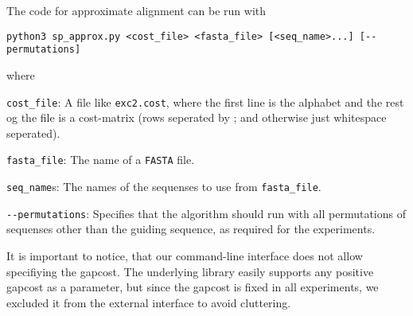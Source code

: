 The code for approximate alignment can be run with

\begin{verbatim}
python3 sp_approx.py <cost_file> <fasta_file> [<seq_name>...] [--permutations]
\end{verbatim}

where

\begin{description}
\item{\verb|cost_file|:} A file like \verb|exc2.cost|, where the
  first line is the alphabet and the rest og the file is a cost-matrix
  (rows seperated by ; and otherwise just whitespace seperated).
\item{\verb|fasta_file|:} The name of a \verb|FASTA| file.
\item{\verb|seq_name|s:} The names of the sequenses to use from
  \verb|fasta_file|.
\item{\verb|--permutations|:} Specifies that the algorithm should run
  with all permutations of sequenses other than the guiding sequence,
  as required for the experiments.
\end{description}

It is important to notice, that our command-line interface does not allow specifiying the gapcost. The underlying library easily supports any positive gapcost as a parameter, but since the gapcost is fixed in all experiments, we excluded it from the external interface to avoid cluttering. 
